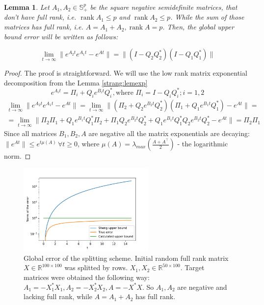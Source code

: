 \documentclass{article}
\newtheorem{lemma}{Lemma}
\begin{document}
\begin{lemma}
	\label{strang:lemupper_2}
	Let $A_1, A_2 \in \mathbb{S}^p_{+}$ be the square negative semidefinite matrices, that don't have full rank, i.e. $\operatorname{rank}{A_1} \leq p$ and $\operatorname{rank}{A_2} \leq p$. While the sum of those matrices has full rank, i.e. $A = A_1 + A_2, \operatorname{rank}{A} = p$. Then, the global upper bound error will be written as follows:

	\begin{equation}\label{strang:lemupper}
		\lim_{t \to \infty}\| e^{A_2t}e^{A_1t} - e^{At}\| = \|(I - Q_2Q_2^*)(I - Q_1Q_1^*)\|
	\end{equation}
\end{lemma}
\begin{proof}
	The proof is straightforward. We will use the low rank matrix exponential decomposition from the Lemma \ref{strang:lemexp}
	$$
	e^{A_it} = \Pi_i + Q_i e^{B_it} Q_i^*, \text{where } \Pi_i = I - Q_iQ_i^*; i = 1,2
	$$
	\begin{align*}
	\lim_{t \to \infty}\| e^{A_2t}e^{A_1t} - e^{At}\| = \lim_{t \to \infty}\| (\Pi_2 + Q_2 e^{B_2t} Q_2^*)(\Pi_1 + Q_1 e^{B_1t} Q_1^*) - e^{At}\| = \\
	= \lim_{t \to \infty}\| \Pi_2\Pi_1 + Q_1 e^{B_1t} Q_1^*\Pi_2 + \Pi_1Q_2 e^{B_2t} Q_2^* +  Q_1 e^{B_1t} Q_1^* Q_2 e^{B_2t} Q_2^* - e^{At}\| = \Pi_2 \Pi_1
	\end{align*}
	Since all matrices $B_1, B_2, A$ are negative all the matrix exponentials are decaying: $\|e^{At}\|\leq e^{t\mu (A)}\, \forall t\geq 0$, where $\mu(A) = \lambda_{max} \left( \frac{A + A^\top}{2}\right)$ - the logarithmic norm.
\end{proof}

\begin{figure}[h!]
	\centering
	\includegraphics[width=0.6\textwidth]{upper_bound_2.pdf}
	\caption{Global error of the splitting scheme. Initial random full rank matrix $X \in \mathbb{R}^{100 \times 100}$ was splitted by rows. $X_1, X_2 \in \mathbb{R}^{50 \times 100}$. Target matrices were obtained the following way: $A_1 = -X_1^*X_1, A_2 = -X_2^*X_2, A = -X^*X$. So $A_1, A_2$ are negative and lacking full rank, while $A = A_1 + A_2$ has full rank.}
	\label{strang:fig:upper_bound_2}
\end{figure}
\end{document}
